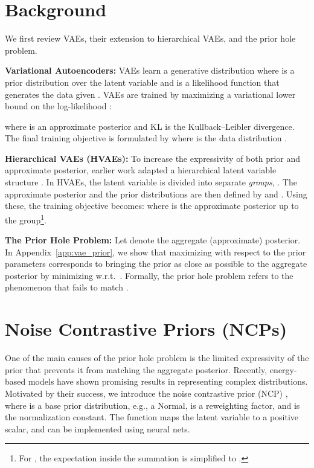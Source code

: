 \documentclass{article} \usepackage{iclr2021_conference,times}
\begin{document}
\section{Background}
We first review VAEs, their extension to hierarchical VAEs, and the prior hole problem.

\textbf{Variational Autoencoders:} VAEs learn a generative distribution 
 where  is a prior distribution over the latent variable  and  is a likelihood function that generates the data   given . 
VAEs are trained by maximizing a variational lower bound on the log-likelihood :

where  is an approximate posterior 
and KL is the Kullback–Leibler divergence. The final training objective is formulated by  where  is the data distribution \citep{kingma2014vae}.


\textbf{Hierarchical VAEs (HVAEs):} To increase the expressivity of both prior and approximate posterior, earlier work adapted a hierarchical latent variable structure \citep{vahdat2020NVAE, kingma2016improved, sonderby2016ladder, gregor2016ConvDraw}. In HVAEs, the latent variable  is divided into  separate {\em groups}, . 
The approximate posterior and the prior distributions are then defined by  and . Using these, the training objective becomes:
where  is the approximate posterior up to the  group\footnote{For , the expectation inside the summation is simplified to .}. 

\textbf{The Prior Hole Problem:} Let  denote the aggregate (approximate) posterior. In Appendix~\ref{app:vae_prior}, we show that maximizing   with respect to the prior parameters corresponds to bringing 
the prior as close as possible to the aggregate posterior by minimizing  w.r.t.\ .
Formally, the prior hole problem refers to the phenomenon that  fails to match . 
 \section{Noise Contrastive Priors (NCPs)}

One of the main causes of the prior hole problem is the limited expressivity of the prior that prevents it from matching the aggregate posterior. Recently, energy-based models have shown promising results in representing complex distributions. Motivated by their success, we introduce the noise contrastive prior (NCP) , where  is a base prior distribution, e.g., a Normal,  is a reweighting factor, and  is the normalization constant. The function  maps the latent variable  to a positive scalar, and can be implemented using neural nets. 
\end{document}
